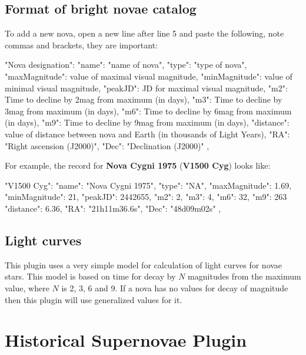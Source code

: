 \subsection{Format of bright novae catalog}
\label{sec:plugins:BrightNovae:format}

To add a new nova, open a new line after line 5 and paste the following, note commas and brackets, they are important:

\begin{configfile}
"Nova designation":
{
    "name": "name of nova",
    "type": "type of nova",
    "maxMagnitude": value of maximal visual magnitude,
    "minMagnitude": value of minimal visual magnitude,
    "peakJD": JD for maximal visual magnitude,
    "m2": Time to decline by 2mag from maximum (in days),
    "m3": Time to decline by 3mag from maximum (in days),
    "m6": Time to decline by 6mag from maximum (in days),
    "m9": Time to decline by 9mag from maximum (in days),
    "distance": value of distance between nova and 
                Earth (in thousands of Light Years),
    "RA": "Right ascension (J2000)",
    "Dec": "Declination (J2000)"
},
\end{configfile}

\noindent For example, the record for \textbf{Nova Cygni 1975} (\textbf{V1500 Cyg}) looks like:
\begin{configfile}
"V1500 Cyg":
{
    "name": "Nova Cygni 1975",
    "type": "NA",
    "maxMagnitude": 1.69,
    "minMagnitude": 21,
    "peakJD": 2442655,
    "m2": 2,
    "m3": 4,
    "m6": 32,
    "m9": 263
    "distance": 6.36,
    "RA": "21h11m36.6s",
    "Dec": "48d09m02s"
},
\end{configfile}

\subsection{Light curves}
\label{sec:plugins:BrightNovae:lightcurves}

This plugin uses a very simple model for calculation of light curves for
novae stars. This model is based on time for decay by $N$
magnitudes from the maximum value, where $N$ is 2, 3, 6 and 9. If a
nova has no values for decay of magnitude then this plugin will use
generalized values for it.

\newpage

\section{Historical Supernovae Plugin}
\label{sec:plugins:HistoricalSupernovae}

